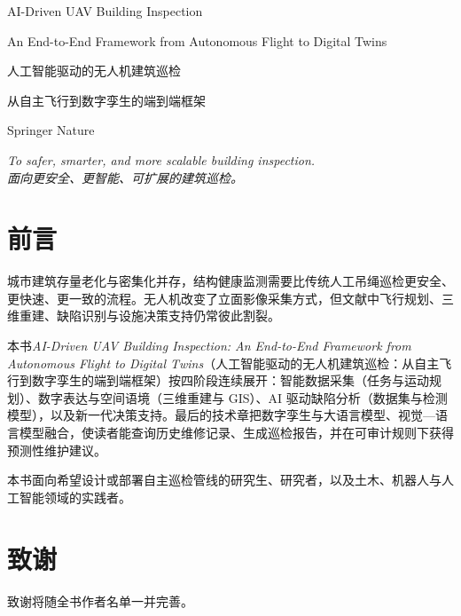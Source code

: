 \documentclass[UTF8,openany,oneside,10pt]{ctexbook}
\begin{document}
\begin{titlepage}
\centering
\vspace*{3cm}
{\Huge AI-Driven UAV Building Inspection\par}
\vspace{1.2cm}
{\LARGE An End-to-End Framework from Autonomous Flight to Digital Twins\par}
\vspace{0.8cm}
{\large 人工智能驱动的无人机建筑巡检\par}
\vspace{0.4cm}
{\large 从自主飞行到数字孪生的端到端框架\par}
\vfill
{\Large Springer Nature\par}
\end{titlepage}

\frontmatter

\begin{center}
\vspace*{4\baselineskip}
{\Large\itshape
To safer, smarter, and more scalable building inspection.\\[0.5em]
面向更安全、更智能、可扩展的建筑巡检。
\par}
\end{center}
\clearpage

\chapter*{前言}
\noindent
城市建筑存量老化与密集化并存，结构健康监测需要比传统人工吊绳巡检更安全、更快速、更一致的流程。无人机改变了立面影像采集方式，但文献中飞行规划、三维重建、缺陷识别与设施决策支持仍常彼此割裂。

本书\emph{AI-Driven UAV Building Inspection: An End-to-End Framework from Autonomous Flight to Digital Twins}（人工智能驱动的无人机建筑巡检：从自主飞行到数字孪生的端到端框架）按四阶段连续展开：智能数据采集（任务与运动规划）、数字表达与空间语境（三维重建与 GIS）、AI 驱动缺陷分析（数据集与检测模型），以及新一代决策支持。最后的技术章把数字孪生与大语言模型、视觉—语言模型融合，使读者能查询历史维修记录、生成巡检报告，并在可审计规则下获得预测性维护建议。

本书面向希望设计或部署自主巡检管线的研究生、研究者，以及土木、机器人与人工智能领域的实践者。

\chapter*{致谢}
\noindent
致谢将随全书作者名单一并完善。
\end{document}
